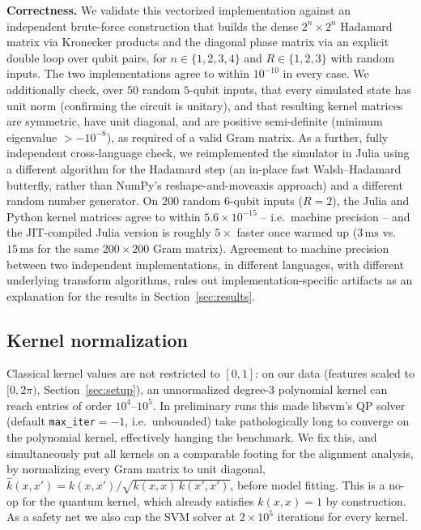 \documentclass{article}
\begin{document}
\textbf{Correctness.} We validate this vectorized implementation against an
independent brute-force construction that builds the dense $2^n \times 2^n$
Hadamard matrix via Kronecker products and the diagonal phase matrix via an
explicit double loop over qubit pairs, for $n \in \{1,2,3,4\}$ and $R \in
\{1,2,3\}$ with random inputs. The two implementations agree to within
$10^{-10}$ in every case. We additionally check, over $50$ random $5$-qubit
inputs, that every simulated state has unit norm (confirming the circuit is
unitary), and that resulting kernel matrices are symmetric, have unit
diagonal, and are positive semi-definite (minimum eigenvalue $> -10^{-8}$),
as required of a valid Gram matrix. As a further, fully independent
cross-language check, we reimplemented the simulator in Julia using a
different algorithm for the Hadamard step (an in-place fast
Walsh--Hadamard butterfly, rather than NumPy's reshape-and-moveaxis
approach) and a different random number generator. On $200$ random
$6$-qubit inputs ($R=2$), the Julia and Python kernel matrices agree to
within $5.6\times10^{-15}$ -- i.e.\ machine precision -- and the
JIT-compiled Julia version is roughly $5\times$ faster once warmed up
($3\,\mathrm{ms}$ vs.\ $15\,\mathrm{ms}$ for the same $200\times200$ Gram
matrix). Agreement to machine precision between two independent
implementations, in different languages, with different underlying
transform algorithms, rules out implementation-specific artifacts as an
explanation for the results in Section~\ref{sec:results}.

\subsection{Kernel normalization}

Classical kernel values are not restricted to $[0,1]$: on our data (features
scaled to $[0, 2\pi)$, Section~\ref{sec:setup}), an unnormalized degree-3
polynomial kernel can reach entries of order $10^4$--$10^5$. In preliminary
runs this made libsvm's QP solver (default \texttt{max\_iter}$=-1$, i.e.\
unbounded) take pathologically long to converge on the polynomial kernel,
effectively hanging the benchmark. We fix this, and simultaneously put all
kernels on a comparable footing for the alignment analysis, by normalizing
every Gram matrix to unit diagonal, $\hat k(x,x') = k(x,x') /
\sqrt{k(x,x)\,k(x',x')}$, before model fitting. This is a no-op for the
quantum kernel, which already satisfies $k(x,x)=1$ by construction. As a
safety net we also cap the SVM solver at $2\times10^5$ iterations for every
kernel.
\end{document}
